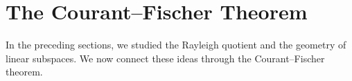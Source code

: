 \documentclass[14pt,letterpaper]{article}
\theoremstyle{plain}
\theoremstyle{definition}
\theoremstyle{remark}
\newcommand{\R}{\mathbb{R}}
\newcommand{\norm}[1]{\left\lVert #1 \right\rVert}
\newcommand{\abs}[1]{\left| #1 \right|}
\DeclareMathOperator{\range}{range}
\begin{document}

\section{The Courant--Fischer Theorem}
\label{sec:courant_fischer}

In the preceding sections, we studied the Rayleigh quotient
and the geometry of linear subspaces. We now connect these
ideas through the Courant--Fischer theorem.
\end{document}
